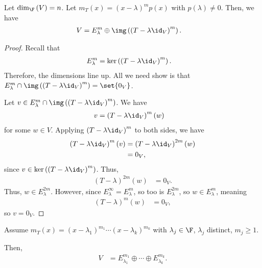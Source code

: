 \documentclass[10pt]{mypackage}
\begin{document}
\begin{lemma}
  Let $\dim_{\F}\left(V\right) = n$. Let $m_T(x) = \left(x-\lambda\right)^mp(x)$ with $p\left(\lambda\right)\neq 0$. Then, we have
  \begin{align*}
    V &= E_{\lambda}^{m} \oplus \img\left(\left(T-\lambda\id_V\right)^m\right).
  \end{align*}
\end{lemma}
\begin{proof}
  Recall that
  \begin{align*}
    E_{\lambda}^{m} &= \ker\left(\left(T-\lambda\id_{V}\right)^m\right).
  \end{align*}
  Therefore, the dimensions line up. All we need show is that $E_{\lambda}^{m}\cap \img\left(\left(T-\lambda\id_V\right)^m\right) = \set{0_V}$.\newline

  Let $v\in E_{\lambda}^{m}\cap \img\left(\left(T-\lambda\id_V\right)^m\right)$. We have
  \begin{align*}
    v &= \left(T-\lambda\id_V\right)^{m}\left(w\right)
  \end{align*}
  for some $w\in V$. Applying $\left(T-\lambda\id_V\right)^{m}$ to both sides, we have
  \begin{align*}
    \left(T-\lambda\id_V\right)^{m}\left(v\right) &= \left(T-\lambda\id_V\right)^{2m}(w)\\
                                                  &=0_V,
  \end{align*}
  since $v\in \ker\left(\left(T-\lambda\id_V\right)^m\right)$. Thus,
  \begin{align*}
    \left(T-\lambda\right)^{2m}(w) &= 0_V.
  \end{align*}
  Thus, $w\in E_{\lambda}^{2m}$. However, since $E_{\lambda}^{\infty} = E_{\lambda}^{m}$, so too is $E_{\lambda}^{2m}$, so $w\in E_{\lambda}^{m}$, meaning
  \begin{align*}
    \left(T-\lambda\right)^{m}\left(w\right) &= 0_V,
  \end{align*}
  so $v = 0_V$.
\end{proof}
\begin{theorem}
  Assume $m_T(x) = \left(x-\lambda_1\right)^{m_1}\cdots\left(x-\lambda_k\right)^{m_k}$ with $\lambda_j\in \F$, $\lambda_j$ distinct, $m_j\geq 1$.\newline

  Then, 
  \begin{align*}
    V &= E_{\lambda_1}^{m_1} \oplus \cdots \oplus E_{\lambda_k}^{m_k}.
  \end{align*}
\end{theorem}
\end{document}
